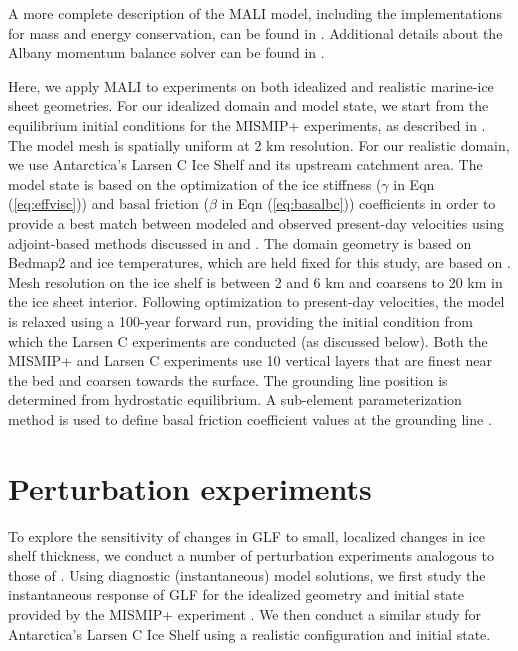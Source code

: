\documentclass[review,oneside]{igs}
\begin{document}
A more complete description of the MALI model, including the implementations for mass and energy conservation, can be found in \citet{hoffman2018}. Additional details about the Albany momentum balance solver can be found in \citet{tezaur2015a,tezaur2015b}. 

Here, we apply MALI to experiments on both idealized and realistic marine-ice sheet geometries. For our idealized domain and model state, we start from the equilibrium initial conditions for the MISMIP+ experiments, as described in \citet{asay2016}. The model mesh is spatially uniform at 2 km resolution. For our realistic domain, we use Antarctica's Larsen C Ice Shelf and its upstream catchment area. The model state is based on the optimization of the ice stiffness ($\gamma$ in Eqn (\ref{eq:effvisc})) and basal friction ($\beta$ in Eqn (\ref{eq:basalbc})) coefficients in order to provide a best match between modeled and observed present-day velocities \citep{rignot2014} using adjoint-based methods discussed in \citet{perego2014} and \citet{hoffman2018}. The domain geometry is based on Bedmap2 \citep{fretwell2013} and ice temperatures, which are held fixed for this study, are based on \citet{liefferinge2013}. Mesh resolution on the ice shelf is between 2 and 6 km and coarsens to 20 km in the ice sheet interior. Following optimization to present-day velocities, the model is relaxed using a 100-year forward run, providing the initial condition from which the Larsen C experiments are conducted (as discussed below). Both the MISMIP+ and Larsen C experiments use 10 vertical layers that are finest near the bed and coarsen towards the surface. The grounding line position is determined from hydrostatic equilibrium. A sub-element parameterization method is used to define basal friction coefficient values at the grounding line \citep{seroussi2014} . 


\section{Perturbation experiments}

To explore the sensitivity of changes in GLF to small, localized changes in ice shelf thickness, we conduct a number of perturbation experiments analogous to those of \citet{reese2018}. Using diagnostic (instantaneous) model solutions, we first study the instantaneous response of GLF for the idealized geometry and initial state provided by the MISMIP+ experiment \citep{asay2016}. We then conduct a similar study for Antarctica's Larsen C Ice Shelf using a realistic configuration and initial state. 
\end{document}
